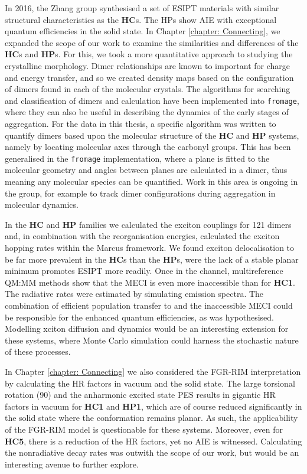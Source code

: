 In 2016, the Zhang group synthesised a set of ESIPT  materials with similar structural characteristics as the \textbf{HC}s. The \acp{HP} show AIE with exceptional quantum efficiencies in the solid state. In Chapter \ref{chapter: Connecting}, we expanded the scope of our work to examine the similarities and differences of the \textbf{HC}s and \textbf{HP}s. For this, we took a more quantitative approach to studying the crystalline morphology. Dimer relationships are known to important for charge and energy transfer, and so we created density maps based on the configuration of dimers found in each of the molecular crystals. The algorithms for searching and classification of dimers and calculation have been implemented into \texttt{fromage}, where they can also be useful in describing the dynamics of the early stages of aggregation.\cite{fromage} For the data in this thesis, a specific algorithm was written to quantify dimers based upon the molecular structure of the \textbf{HC} and \textbf{HP} systems, namely by locating molecular axes through the carbonyl groups. This has been generalised in the \texttt{fromage} implementation, where a plane is fitted to the molecular geometry and angles between planes are calculated in a dimer, thus meaning any molecular species can be quantified. Work in this area is ongoing in the group, for example to track dimer configurations during aggregation in molecular dynamics.  

In the \textbf{HC} and \textbf{HP} families we calculated the exciton couplings for 121 dimers and, in combination with the reorganisation energies, calculated the exciton hopping rates within the Marcus framework. We found exciton delocalisation to be far more prevalent in the \textbf{HC}s than the \textbf{HP}s, were the lack of a stable planar \Estar{} minimum promotes ESIPT more readily. Once in the \Kstar{} channel, multireference QM:MM methods show that the MECI is even more inaccessible than for \textbf{HC1}. The radiative rates were estimated by simulating emission spectra. The combination of efficient population transfer to \Kstar{} and the inaccessible MECI could be responsible for the enhanced quantum efficiencies, as was hypothesised. Modelling xciton diffusion and dynamics would be an interesting extension for these systems, where Monte Carlo simulation could harness the stochastic nature of these processes.

In Chapter \ref{chapter: Connecting} we also considered the \ac{FGR-RIM} interpretation by calculating the \ac{HR} factors in vacuum and the solid state. The large torsional rotation (90\degree{}) and the anharmonic excited state \ac{PES} results in gigantic \ac{HR} factors in vacuum for \textbf{HC1} and \textbf{HP1}, which are of course reduced significantly in the solid state where the conformation remains planar. As such, the applicability of the \ac{FGR-RIM} model is questionable for these systems. Moreover, even for \textbf{HC5}, there is a reduction of the \ac{HR} factors, yet no AIE is witnessed. Calculating the nonradiative decay rates was outwith the scope of our work, but would be an interesting avenue to further explore.


